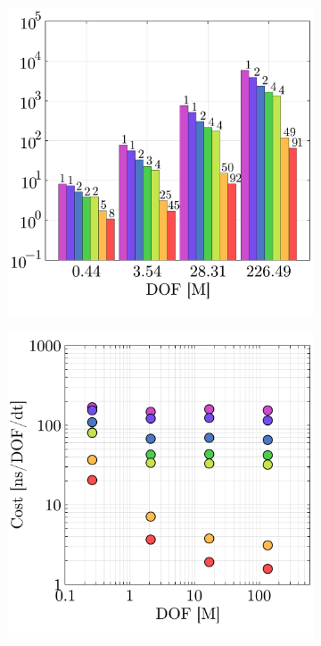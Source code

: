 \documentclass[10pt,a4paper]{article}
\begin{document}
\begin{figure}[!t]
\begin{subfigure}[t]{0.32\linewidth}
  \end{subfigure}
  \begin{subfigure}[t]{0.32\linewidth}
    \centering\hspace*{-0.2cm}
    \includegraphics[width=\linewidth]{img/cylinder_benchmark.pdf}
  \end{subfigure}
  \begin{subfigure}[t]{0.32\linewidth}
    \centering
    \includegraphics[width=\linewidth]{img/tgv_cost.pdf}

\end{subfigure}
\end{figure}
\end{document}
